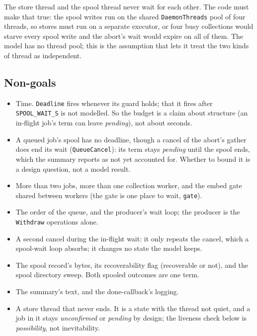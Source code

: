 \documentclass[a4paper,10pt,fleqn]{article}
\newcommand{\field}[1]{\texttt{#1}}
\begin{document}
The store thread and the spool thread never wait for each other. The code must
make that true: the spool writes run on the shared \field{DaemonThreads} pool of
four threads, so stores must run on a separate executor, or four busy
collections would starve every spool write and the abort's wait would expire on
all of them. The model has no thread pool; this is the assumption that lets it
treat the two kinds of thread as independent.

\subsection{Non-goals}

\begin{itemize}
  \item Time. \field{Deadline} fires whenever its guard holds; that it fires
    after \field{SPOOL\_WAIT\_S} is not modelled. So the budget is a claim about
    structure (an in-flight job's term can leave \emph{pending}), not about
    seconds.
  \item A queued job's spool has no deadline, though a cancel of the abort's
    gather does end its wait (\field{QueueCancel}): its term stays \emph{pending}
    until the spool ends, which the summary reports as not yet accounted for.
    Whether to bound it is a design question, not a model result.
  \item More than two jobs, more than one collection worker, and the embed gate
    shared between workers (the gate is one place to wait, \field{gate}).
  \item The order of the queue, and the producer's wait loop; the producer is the
    \field{Withdraw} operations alone.
  \item A second cancel during the in-flight wait: it only repeats the cancel,
    which a spool-wait loop absorbs; it changes no state the model keeps.
  \item The spool record's bytes, its recoverability flag (recoverable or
    not), and the spool directory sweep. Both spooled outcomes are one term.
  \item The summary's text, and the done-callback's logging.
  \item A store thread that never ends. It is a state with the thread not quiet,
    and a job in it stays \emph{unconfirmed} or \emph{pending} by design; the
    liveness check below is \emph{possibility}, not inevitability.
\end{itemize}

\end{document}

